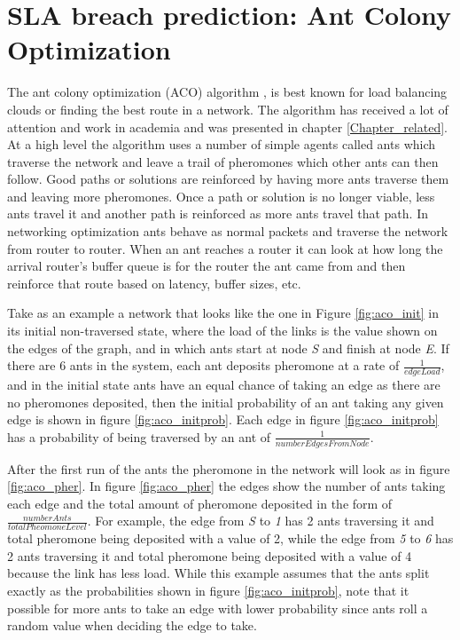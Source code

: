 \documentclass[conference]{IEEEtran}
\begin{document}
\section{SLA breach prediction: Ant Colony Optimization}

The ant colony optimization (ACO) algorithm \cite{antalgorithm}, \cite{selforg:aco} is best known for load balancing clouds or finding the best route in a network. The algorithm has received a lot of attention and work in academia and was presented in chapter \ref{Chapter_related}. At a high level the algorithm uses a number of simple agents called ants which traverse the network and leave a trail of pheromones which other ants can then follow. Good paths or solutions are reinforced by having more ants traverse them and leaving more pheromones. Once a path or solution is no longer viable, less ants travel it and another path is reinforced as more ants travel that path. In networking optimization ants behave as normal packets and traverse the network from router to router. When an ant reaches a router it can look at how long the arrival router's buffer queue is for the router the ant came from and then reinforce that route based on latency, buffer sizes, etc.

Take as an example a network that looks like the one in Figure \ref{fig:aco_init} in its initial non-traversed state, where the load of the links is the value shown on the edges of the graph, and in which ants start at node \textit{S} and finish at node \textit{E}. If there are 6 ants in the system, each ant deposits pheromone at a rate of $\frac{1}{edgeLoad}$, and in the initial state ants have an equal chance of taking an edge as there are no pheromones deposited, then the initial probability of an ant taking any given edge is shown in figure \ref{fig:aco_initprob}. Each edge in figure \ref{fig:aco_initprob} has a probability of being traversed by an ant of $\frac{1}{numberEdgesFromNode}$.

After the first run of the ants the pheromone in the network will look as in figure \ref{fig:aco_pher}. In figure \ref{fig:aco_pher} the edges show the number of ants taking each edge and the total amount of pheromone deposited in the form of $\frac{numberAnts}{totalPheomoneLevel}$. For example, the edge from \textit{S} to \textit{1} has 2 ants traversing it and total pheromone being deposited with a value of 2, while the edge from \textit{5} to \textit{6} has 2 ants traversing it and total pheromone being deposited with a value of 4 because the link has less load. While this example assumes that the ants split exactly as the probabilities shown in figure \ref{fig:aco_initprob}, note that it possible for more ants to take an edge with lower probability since ants roll a random value when deciding the edge to take.
\end{document}
